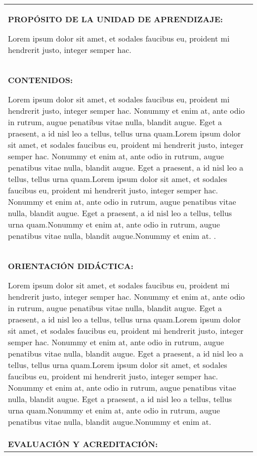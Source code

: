 \documentclass[10pt]{article}
\begin{document}
\begin{table}[H]
  \begin{tabular}{|p{}|}
    \hline
    \textbf{PROPÓSITO DE LA UNIDAD DE APRENDIZAJE:}

    Lorem ipsum dolor sit amet, et sodales faucibus eu, proident mi hendrerit justo, integer semper hac. \\

    \textbf{CONTENIDOS:}

    Lorem ipsum dolor sit amet, et sodales faucibus eu, proident mi hendrerit justo, integer semper hac. Nonummy et enim at, ante odio in rutrum, augue penatibus vitae nulla, blandit augue. Eget a praesent, a id nisl leo a tellus, tellus urna quam.Lorem ipsum dolor sit amet, et sodales faucibus eu, proident mi hendrerit justo, integer semper hac. Nonummy et enim at, ante odio in rutrum, augue penatibus vitae nulla, blandit augue. Eget a praesent, a id nisl leo a tellus, tellus urna quam.Lorem ipsum dolor sit amet, et sodales faucibus eu, proident mi hendrerit justo, integer semper hac. Nonummy et enim at, ante odio in rutrum, augue penatibus vitae nulla, blandit augue. Eget a praesent, a id nisl leo a tellus, tellus urna quam.Nonummy et enim at, ante odio in rutrum, augue penatibus vitae nulla, blandit augue.Nonummy et enim at. .\\ 

    \textbf{ORIENTACIÓN DIDÁCTICA:}

    Lorem ipsum dolor sit amet, et sodales faucibus eu, proident mi hendrerit justo, integer semper hac. Nonummy et enim at, ante odio in rutrum, augue penatibus vitae nulla, blandit augue. Eget a praesent, a id nisl leo a tellus, tellus urna quam.Lorem ipsum dolor sit amet, et sodales faucibus eu, proident mi hendrerit justo, integer semper hac. Nonummy et enim at, ante odio in rutrum, augue penatibus vitae nulla, blandit augue. Eget a praesent, a id nisl leo a tellus, tellus urna quam.Lorem ipsum dolor sit amet, et sodales faucibus eu, proident mi hendrerit justo, integer semper hac. Nonummy et enim at, ante odio in rutrum, augue penatibus vitae nulla, blandit augue. Eget a praesent, a id nisl leo a tellus, tellus urna quam.Nonummy et enim at, ante odio in rutrum, augue penatibus vitae nulla, blandit augue.Nonummy et enim at. \\ 

    \textbf{EVALUACIÓN Y ACREDITACIÓN:}


\end{tabular}
\end{table}
\end{document}
